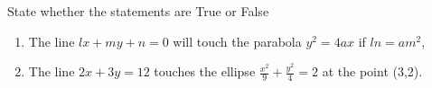 State whether the statements are True or False 
\begin{enumerate}[label=\thesection.\arabic*,ref=\thesection.\theenumi,resume*]
\item The line $lx+my+n=0$ will touch the parabola $y^2=4 ax$ if $ln =am^2$,
\item The line $2x+3y=12$ touches the ellipse $\frac{x^2}{9}+\frac{y^2}{4}=2$ at the point (3,2).
\end{enumerate}
